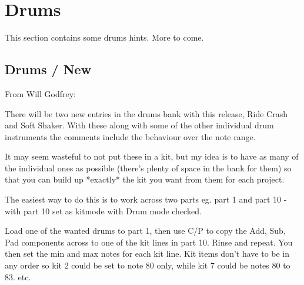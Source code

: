 %
%
%

\section{Drums}
\label{sec:drums}

   This section contains some drums hints.  More to come.

\subsection{Drums / New}
\label{subsec:drums_new}

   From Will Godfrey:

   There will be two new entries in the drums bank with this release, Ride
   Crash and Soft Shaker. With these along with some of the other individual
   drum instruments the comments include the behaviour over the note range.

   It may seem wasteful to not put these in a kit, but my idea is to have as
   many of the individual ones as possible (there's plenty of space in the bank
   for them) so that you can build up *exactly* the kit you want from them for
   each project.

   The easiest way to do this is to work across two parts eg. part 1 and part
   10 -  with part 10 set as kitmode with Drum mode checked.

   Load one of the wanted drums to part 1, then use C/P to copy the Add, Sub,
   Pad components across to one of the kit lines in part 10. Rinse and repeat.
   You then  set the min and max notes for each kit line. Kit items don't have
   to be in any order so kit 2 could be set to note 80 only, while kit 7 could
   be notes 80 to 83. etc.


